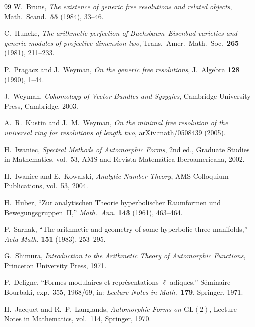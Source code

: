 \documentclass[11pt,oneside]{amsbook}
\numberwithin{equation}{section}
\theoremstyle{plain}
\theoremstyle{definition}
\theoremstyle{remark}
\begin{document}
\begin{thebibliography}{99}
W.~Bruns,
\newblock \emph{The existence of generic free resolutions and related objects},
\newblock Math.\ Scand.\ \textbf{55} (1984), 33--46.

C.~Huneke,
\newblock \emph{The arithmetic perfection of Buchsbaum--Eisenbud varieties and generic
modules of projective dimension two},
\newblock Trans.\ Amer.\ Math.\ Soc.\ \textbf{265} (1981), 211--233.

P.~Pragacz and J.~Weyman,
\newblock \emph{On the generic free resolutions},
\newblock J.\ Algebra \textbf{128} (1990), 1--44.

J.~Weyman,
\newblock \emph{Cohomology of Vector Bundles and Syzygies},
\newblock Cambridge University Press, Cambridge, 2003.

A.~R.~Kustin and J.~M.~Weyman,
\newblock \emph{On the minimal free resolution of the universal ring for resolutions of length two},
\newblock arXiv:math/0508439 (2005).

H.~Iwaniec,
\newblock \emph{Spectral Methods of Automorphic Forms}, 2nd ed.,
\newblock Graduate Studies in Mathematics, vol.~53, AMS and Revista Matem\'atica Iberoamericana, 2002.

H.~Iwaniec and E.~Kowalski,
\newblock \emph{Analytic Number Theory},
\newblock AMS Colloquium Publications, vol.~53, 2004.

H.~Huber,
\newblock ``Zur analytischen Theorie hyperbolischer Raumformen und Bewegungsgruppen~II,''
\newblock \emph{Math.\ Ann.} \textbf{143} (1961), 463--464.

P.~Sarnak,
\newblock ``The arithmetic and geometry of some hyperbolic three-manifolds,''
\newblock \emph{Acta Math.} \textbf{151} (1983), 253--295.

G.~Shimura,
\newblock \emph{Introduction to the Arithmetic Theory of Automorphic Functions},
\newblock Princeton University Press, 1971.

P.~Deligne,
\newblock ``Formes modulaires et repr\'esentations $\ell$-adiques,''
\newblock S\'eminaire Bourbaki, exp.~355, 1968/69, in: \emph{Lecture Notes in Math.}\ \textbf{179}, Springer, 1971.

H.~Jacquet and R.~P.~Langlands,
\newblock \emph{Automorphic Forms on $\mathrm{GL}(2)$},
\newblock Lecture Notes in Mathematics, vol.~114, Springer, 1970.


\end{thebibliography}
\end{document}

